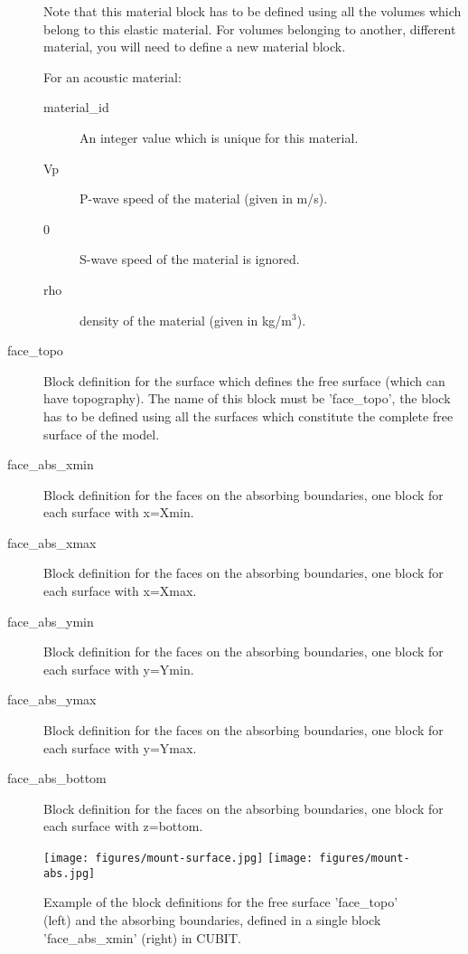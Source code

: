 \begin{description}
Note that this material block has to be defined using all the volumes
which belong to this elastic material. For volumes belonging to another,
different material, you will need to define a new material block.


For an acoustic material:
\begin{description}
\item [{material\_id}] An integer value which is unique for this material.
\item [{Vp}] P-wave speed of the material (given in m/s).
\item [{0}] S-wave speed of the material is ignored.
\item [{rho}] density of the material (given in kg/m$^{3}$).
\end{description}
\item [{face\_topo}] Block definition for the surface which defines the
free surface (which can have topography). The name of this block must
be 'face\_topo', the block has to be defined using all the surfaces
which constitute the complete free surface of the model.
\item [{face\_abs\_xmin}] Block definition for the faces on the absorbing
boundaries, one block for each surface with x=Xmin.
\item [{face\_abs\_xmax}] Block definition for the faces on the absorbing
boundaries, one block for each surface with x=Xmax.
\item [{face\_abs\_ymin}] Block definition for the faces on the absorbing
boundaries, one block for each surface with y=Ymin.
\item [{face\_abs\_ymax}] Block definition for the faces on the absorbing
boundaries, one block for each surface with y=Ymax.
\item [{face\_abs\_bottom}] Block definition for the faces on the absorbing
boundaries, one block for each surface with z=bottom.
\end{description}
%
\begin{figure}[htbp]
\begin{centering}
\texttt{[image: figures/mount-surface.jpg]}
\texttt{[image: figures/mount-abs.jpg]}
\par
\end{centering}
\caption{Example of the block definitions for the free surface 'face\_topo'
(left) and the absorbing boundaries, defined in a single block 'face\_abs\_xmin'
(right) in CUBIT.}
\label{fig:mount.abs}
\end{figure}


